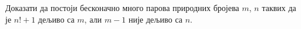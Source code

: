 \problem
Доказати да постоји бесконачно много парова природних бројева $m$, $n$ таквих
да је $n! + 1$ дељиво са $m$, али $m - 1$ није дељиво са $n$.

\solution

\endproblem
